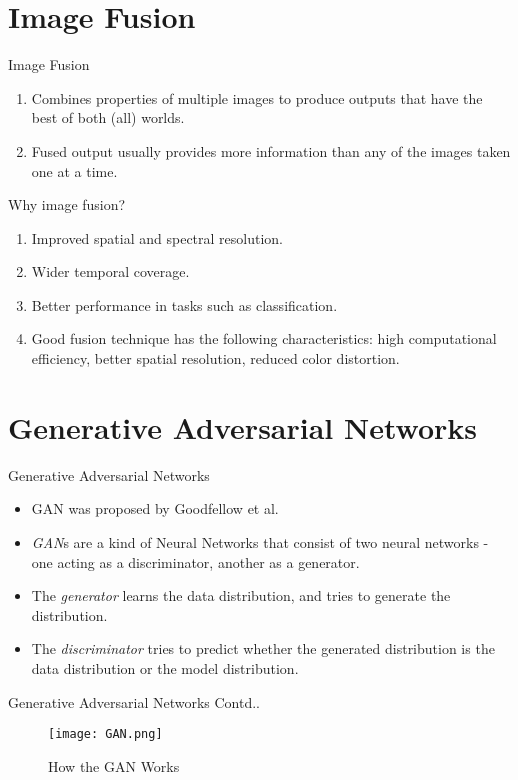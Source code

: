 \documentclass{beamer}
\begin{document}
\section{Image Fusion}
\begin{frame}{Image Fusion}
    \begin{enumerate}
        \item Combines properties of multiple images to produce outputs that have the best of both (all) worlds.
        \item Fused output usually provides more information than any of the images taken one at a time.
    \end{enumerate}
\end{frame}
\begin{frame}{Why image fusion?}
    \begin{enumerate}
        \item Improved spatial and spectral resolution.
        \item Wider temporal coverage.
        \item Better performance in tasks such as classification.
        \item Good fusion technique has the following characteristics: high computational efficiency, better spatial resolution, reduced color distortion.
    \end{enumerate}
\end{frame}
\section{Generative Adversarial Networks}
\begin{frame}{Generative Adversarial Networks}
    \begin{itemize}
        \item GAN was proposed by Goodfellow et al. \cite{Goodfellow2020}
        \item \textit{GAN}s are a kind of Neural Networks that consist of two neural networks - one acting as a discriminator, another as a generator.
        \item The \textit{generator} learns the data distribution, and tries to generate the distribution.
        \item The \textit{discriminator} tries to predict whether the generated distribution is the data distribution or the model distribution.
    \end{itemize}
\end{frame}
\begin{frame}{Generative Adversarial Networks Contd..}
    \begin{figure}
        \centering
        \texttt{[image: GAN.png]}
        \caption{How the GAN Works}
        \label{fig:fig-1}
    \end{figure}
\end{frame}
\end{document}
